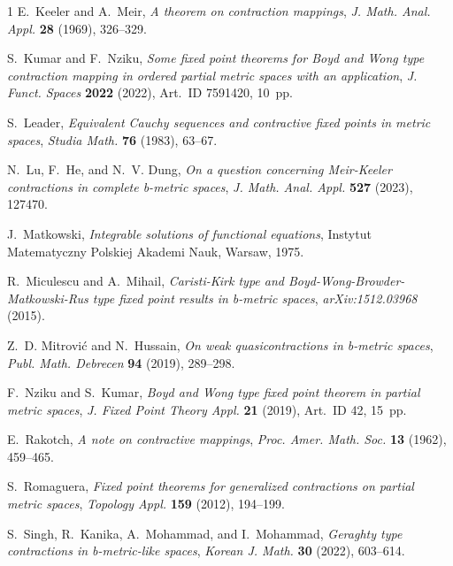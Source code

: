 \documentclass{birkjour}
\theoremstyle{definition}
\theoremstyle{remark}
\numberwithin{equation}{section}
\begin{document}
\begin{thebibliography}{1}
E.~Keeler and A.~Meir,
\textit{A theorem on contraction mappings},
\textit{J. Math. Anal. Appl.} \textbf{28} (1969), 326--329.

S.~Kumar and F.~Nziku,
\textit{Some fixed point theorems for Boyd and Wong type contraction mapping in ordered partial metric spaces with an application},
\textit{J. Funct. Spaces} \textbf{2022} (2022), Art.~ID 7591420, 10~pp.

S.~Leader,
\textit{Equivalent Cauchy sequences and contractive fixed points in metric spaces},
\textit{Studia Math.} \textbf{76} (1983), 63--67.

N.~Lu, F.~He, and N.~V. Dung,
\textit{On a question concerning Meir-Keeler contractions in complete b-metric spaces},
\textit{J. Math. Anal. Appl.} \textbf{527} (2023), 127470.

J.~Matkowski,
\textit{Integrable solutions of functional equations},
Instytut Matematyczny Polskiej Akademi Nauk, Warsaw, 1975.

R.~Miculescu and A.~Mihail,
\textit{Caristi-Kirk type and Boyd-Wong-Browder-Matkowski-Rus type fixed point results in b-metric spaces},
\textit{arXiv:1512.03968} (2015).

Z.~D. Mitrovi\'{c} and N.~Hussain,
\textit{On weak quasicontractions in b-metric spaces},
\textit{Publ. Math. Debrecen} \textbf{94} (2019), 289--298.

F.~Nziku and S.~Kumar,
\textit{Boyd and Wong type fixed point theorem in partial metric spaces},
\textit{J. Fixed Point Theory Appl.} \textbf{21} (2019), Art.~ID 42, 15~pp. %

E.~Rakotch,
\textit{A note on contractive mappings},
\textit{Proc. Amer. Math. Soc.} \textbf{13} (1962), 459--465.

S.~Romaguera,
\textit{Fixed point theorems for generalized contractions on partial metric spaces},
\textit{Topology Appl.} \textbf{159} (2012), 194--199.

S.~Singh, R.~Kanika, A.~Mohammad, and I.~Mohammad,
\textit{Geraghty type contractions in b-metric-like spaces},
\textit{Korean J. Math.} \textbf{30} (2022), 603--614.

\end{thebibliography}
\end{document}
